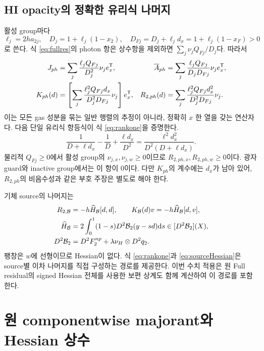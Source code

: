 \subsection{HI opacity의 정확한 유리식 나머지}
활성 group마다
\begin{equation}
\ell_j=2ha_{2j},\quad D_j=1+\ell_j(1-x_2),\quad
D_{Fj}=D_j+\ell_jd_x=1+\ell_j(1-x_F)>0
\label{eq:DF}
\end{equation}
로 쓴다. 식 \eqref{eq:fullres}의 photon 항은 상수항을 제외하면 $\sum_j\nu_jQ_{Fj}/D_j$다. 따라서
\begin{align}
J_{ph}&=\sum_j\frac{\ell_jQ_{Fj}}{D_j^2}\nu_je_x^{\mathsf T},&
\overline A_{ph}&=\sum_j\frac{\ell_jQ_{Fj}}{D_jD_{Fj}}\nu_je_x^{\mathsf T},\\
K_{ph}(d)&=\left[\sum_j\frac{\ell_j^2Q_{Fj}d_x}{D_j^2D_{Fj}}\nu_j\right]e_x^{\mathsf T},&
R_{2,ph}(d)&=\sum_j\frac{\ell_j^2Q_{Fj}d_x^2}{D_j^2D_{Fj}}\nu_j.
\label{eq:rankone}
\end{align}
이는 모든 gas 성분을 묶는 일반 행렬의 추정이 아니라, 정확히 $x$ 한 열을 갖는 연산자다. 다음 단일 유리식 항등식이 식 \eqref{eq:rankone}을 증명한다.
\begin{equation}
\frac1{D+\ell d_x}-\frac1D+\frac{\ell d_x}{D^2}
=\frac{\ell^2d_x^2}{D^2(D+\ell d_x)}.
\label{eq:rationalid}
\end{equation}
물리적 $Q_{Fj}\ge0$에서 활성 group의 $\nu_{j,x},\nu_{j,w}\ge0$이므로 $R_{2,ph,x},R_{2,ph,w}\ge0$이다. 광자 guard와 inactive group에서는 이 항이 0이다. 다만 $K_{ph}$의 계수에는 $d_x$가 남아 있어, $R_{2,ph}$의 비음수성과 같은 부호 주장은 별도로 해야 한다.

기체 source의 나머지는
\begin{align}
R_{2,\mathcal B}&=-h\widehat H_{\mathcal B}[d,d],\qquad
K_{\mathcal B}(d)v=-h\widehat H_{\mathcal B}[d,v],\\
\widehat H_{\mathcal B}&=2\int_0^1(1-s)D^2\mathcal B_2(y-sd)\mathrm d s
\in[D^2\mathcal B_2](X),\notag\\
D^2\mathcal B_2&=D^2F_2^{np}+\lambda\nu_H\otimes D^2q_2.
\label{eq:sourceHessian}
\end{align}
팽창은 $w$에 선형이므로 Hessian이 없다. 식 \eqref{eq:rankone}과 \eqref{eq:sourceHessian}은 source별 이차 나머지를 직접 구성하는 경로를 제공한다. 이번 수치 적용은 원 Full residual의 signed Hessian 전체를 사용한 보편 상계도 함께 계산하여 이 경로를 포함한다.

\section{원 componentwise majorant와 Hessian 상수}\label{sec:bounds}
